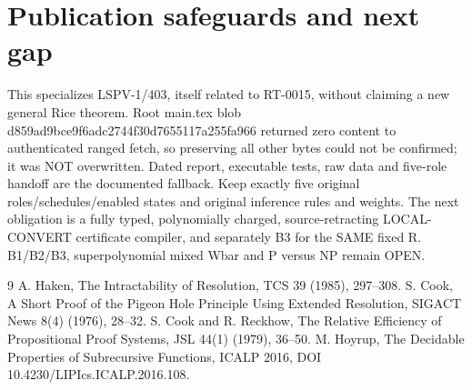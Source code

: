 \documentclass[11pt]{article}
\begin{document}
\section*{Publication safeguards and next gap}
This specializes LSPV-1/403, itself related to RT-0015, without claiming a new general Rice theorem. Root main.tex blob d859ad9bce9f6adc2744f30d7655117a255fa966 returned zero content to authenticated ranged fetch, so preserving all other bytes could not be confirmed; it was NOT overwritten. Dated report, executable tests, raw data and five-role handoff are the documented fallback. Keep exactly five original roles/schedules/enabled states and original inference rules and weights. The next obligation is a fully typed, polynomially charged, source-retracting LOCAL-CONVERT certificate compiler, and separately B3 for the SAME fixed R. B1/B2/B3, superpolynomial mixed Wbar and P versus NP remain OPEN.
\begin{thebibliography}{9}
 A. Haken, The Intractability of Resolution, TCS 39 (1985), 297--308.
 S. Cook, A Short Proof of the Pigeon Hole Principle Using Extended Resolution, SIGACT News 8(4) (1976), 28--32.
 S. Cook and R. Reckhow, The Relative Efficiency of Propositional Proof Systems, JSL 44(1) (1979), 36--50.
 M. Hoyrup, The Decidable Properties of Subrecursive Functions, ICALP 2016, DOI 10.4230/LIPIcs.ICALP.2016.108.
\end{thebibliography}
\end{document}
